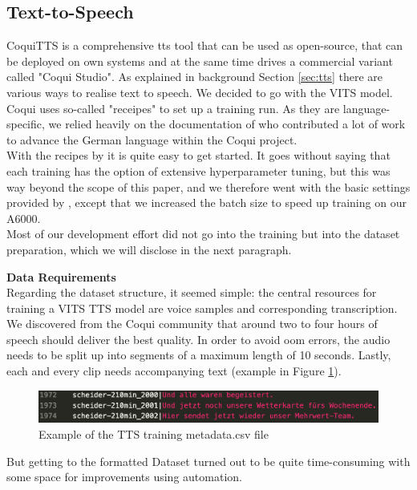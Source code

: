 \documentclass[
  a4paper,  %
  twoside,  %
  bibliography=totoc,
  headsepline,
  cleardoublepage=empty,
  parskip=half,
  draft=false
]{scrbook}
\begin{document}
\subsection{Text-to-Speech}
CoquiTTS is a comprehensive \gls*{tts} tool that can be used as open-source, that can be deployed on own systems and at the same time drives a commercial variant called "Coqui Studio". As explained in background Section \ref{sec:tts} there are various ways to realise text to speech. We decided to go with the VITS model. Coqui uses so-called "receipes" to set up a training run. As they are language-specific, we relied heavily on the documentation of  who contributed a lot of work to advance the German language within the Coqui project. \\
With the recipes by  it is quite easy to get started. It goes without saying that each training has the option of extensive hyperparameter tuning, but this was way beyond the scope of this paper, and we therefore went with the basic settings provided by , except that we increased the batch size to speed up training on our A6000. \\
Most of our development effort did not go into the training but into the dataset preparation, which we will disclose in the next paragraph.

\textbf{Data Requirements} \\
Regarding the dataset structure, it seemed simple: the central resources for training a VITS TTS model are voice samples and corresponding transcription. We discovered from the Coqui community that around two to four hours of speech should deliver the best quality. In order to avoid \gls{oom} errors, the audio needs to be split up into segments of a maximum length of 10 seconds. Lastly, each and every clip needs accompanying text (example in Figure \ref{fig:metadata.csv}).

\begin{figure}[h]
  \centering
  \includegraphics[width=1\textwidth]{./graphics/tts/csv.png}
  \caption{Example of the TTS training metadata.csv file}
  \label{fig:metadata.csv}
\end{figure}

But getting to the formatted Dataset turned out to be quite time-consuming with some space for improvements using automation.
\end{document}
